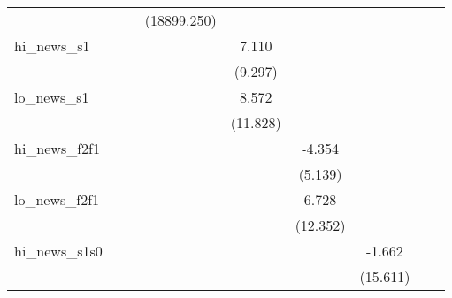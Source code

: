 {\begin{tabular}{l*{8}{c}}
            &                     &                     & (18899.250)         &                     &                     &                     &                     &                     \\
\addlinespace
hi\_news\_s1  &                     &                     &                     &       7.110         &                     &                     &                     &                     \\
            &                     &                     &                     &     (9.297)         &                     &                     &                     &                     \\
\addlinespace
lo\_news\_s1  &                     &                     &                     &       8.572         &                     &                     &                     &                     \\
            &                     &                     &                     &    (11.828)         &                     &                     &                     &                     \\
\addlinespace
hi\_news\_f2f1&                     &                     &                     &                     &      -4.354         &                     &                     &                     \\
            &                     &                     &                     &                     &     (5.139)         &                     &                     &                     \\
\addlinespace
lo\_news\_f2f1&                     &                     &                     &                     &       6.728         &                     &                     &                     \\
            &                     &                     &                     &                     &    (12.352)         &                     &                     &                     \\
\addlinespace
hi\_news\_s1s0&                     &                     &                     &                     &                     &      -1.662         &                     &                     \\
            &                     &                     &                     &                     &                     &    (15.611)         &                     &                     \\

\end{tabular}}
